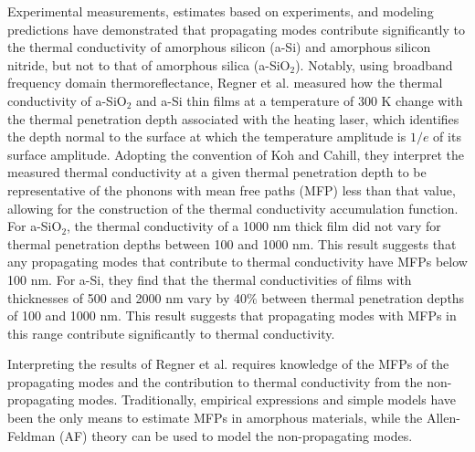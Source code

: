 \documentclass[aps,prb,twocolumn,superscriptaddress,footinbib,amsmath,amssymb,floatfix]{revtex4}
\begin{document}
Experimental measurements, estimates based on experiments, 
and modeling predictions have demonstrated that propagating modes 
contribute
significantly to the thermal conductivity of amorphous silicon (a-Si)
\cite{feldman_thermal_1993,cahill_thermal_1994,
feldman_numerical_1999,liu_high_2009,yang_anomalously_2010,
he_heat_2011,regner_broadband_2013} 
and amorphous silicon nitride,
\cite{sultan_heat_2013} but not to that of 
amorphous silica (a-SiO$_2$).
\cite{freeman_thermal_1986,graebner_phonon_1986,
cahill_lattice_1988,cahill_thermal_1994,love_estimate_1990,
lee_heat_1997,yamane_measurement_2002,baldi_thermal_2008,
regner_broadband_2013} 
Notably, using broadband frequency domain thermoreflectance, 
Regner et al. measured how the thermal conductivity of a-SiO$_2$ 
and a-Si thin films at a temperature of 300 K change with the 
thermal penetration depth associated with the heating laser, 
which identifies the depth normal to the surface at which the 
temperature amplitude
is $1/e$ of its surface amplitude.\cite{regner_broadband_2013} 
Adopting the convention of Koh and Cahill,\cite{koh_frequency_2007} 
they interpret the measured thermal conductivity at a 
given thermal penetration depth to be representative 
of the phonons with mean free paths (MFP) less than that value, 
allowing for the 
construction of the thermal conductivity accumulation 
function.\cite{dames_thermal_2005,yang_mean_2013} 
For a-SiO$_2$, the thermal conductivity of a 1000 nm thick 
film did not vary for thermal penetration depths between 
100 and 1000 nm. This result suggests 
that any propagating modes that contribute to thermal 
conductivity have MFPs below 100 nm. For a-Si, they find that the 
thermal conductivities of films with thicknesses of 500 and 2000 nm 
vary by 40$\%$ between thermal penetration depths of 
100 and 1000 nm. This result suggests that propagating modes with 
MFPs in this range contribute significantly to thermal conductivity.  

Interpreting the results of Regner et al. requires knowledge of 
the MFPs of the 
propagating modes and the contribution to thermal conductivity 
from the non-propagating modes. 
Traditionally, empirical expressions and
simple models have been the only means
to estimate MFPs in amorphous materials,
\cite{graebner_phonon_1986,
freeman_thermal_1986,cahill_lattice_1988,cahill_heat_1989} 
while the Allen-Feldman (AF) theory can be used to model the 
non-propagating modes.\cite{allen_thermal_1993,feldman_thermal_1993}
\end{document}
